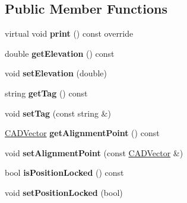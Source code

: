 \subsection*{Public Member Functions}
\begin{DoxyCompactItemize}
\item 
virtual void {\bfseries print} () const  override\hypertarget{class_c_a_d_attrib_a78cb6805de2667a8e72f3906d84a58b6}{}\label{class_c_a_d_attrib_a78cb6805de2667a8e72f3906d84a58b6}

\item 
double {\bfseries get\+Elevation} () const \hypertarget{class_c_a_d_attrib_afb3c3335f16852f401d7313fcb9dc637}{}\label{class_c_a_d_attrib_afb3c3335f16852f401d7313fcb9dc637}

\item 
void {\bfseries set\+Elevation} (double)\hypertarget{class_c_a_d_attrib_aff3d2d57609b1bbd98d393dc55498da5}{}\label{class_c_a_d_attrib_aff3d2d57609b1bbd98d393dc55498da5}

\item 
string {\bfseries get\+Tag} () const \hypertarget{class_c_a_d_attrib_a197eaef21150a38ffc4a0011195329f7}{}\label{class_c_a_d_attrib_a197eaef21150a38ffc4a0011195329f7}

\item 
void {\bfseries set\+Tag} (const string \&)\hypertarget{class_c_a_d_attrib_a51dbe97cbccb9228e35e5e5a0d321bbb}{}\label{class_c_a_d_attrib_a51dbe97cbccb9228e35e5e5a0d321bbb}

\item 
\hyperlink{class_c_a_d_vector}{C\+A\+D\+Vector} {\bfseries get\+Alignment\+Point} () const \hypertarget{class_c_a_d_attrib_a3885ec44a8b70a2bc2a55048f9f36aac}{}\label{class_c_a_d_attrib_a3885ec44a8b70a2bc2a55048f9f36aac}

\item 
void {\bfseries set\+Alignment\+Point} (const \hyperlink{class_c_a_d_vector}{C\+A\+D\+Vector} \&)\hypertarget{class_c_a_d_attrib_a81b06be0005dcbc51ce95378785dbc44}{}\label{class_c_a_d_attrib_a81b06be0005dcbc51ce95378785dbc44}

\item 
bool {\bfseries is\+Position\+Locked} () const \hypertarget{class_c_a_d_attrib_aacb0f9874e95a0e4d4e24afa86e25cee}{}\label{class_c_a_d_attrib_aacb0f9874e95a0e4d4e24afa86e25cee}

\item 
void {\bfseries set\+Position\+Locked} (bool)\hypertarget{class_c_a_d_attrib_aa4e342b54aeb90cded953f8e47f32b08}{}\label{class_c_a_d_attrib_aa4e342b54aeb90cded953f8e47f32b08}

\end{DoxyCompactItemize}
